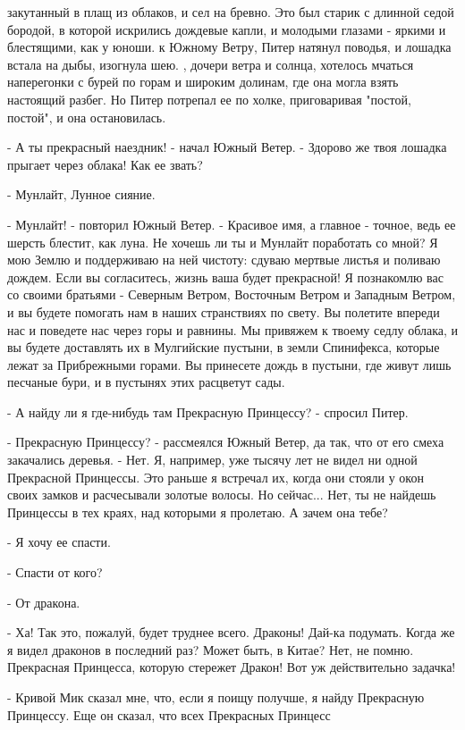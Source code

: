 закутанный в плащ из облаков, и сел на бревно. Это был старик с 
длинной седой бородой, в которой искрились дождевые капли, и молодыми 
глазами - яркими и блестящими, как у юноши.
 к Южному Ветру, Питер натянул поводья, и лошадка встала 
на дыбы, изогнула шею.
, дочери ветра и солнца, хотелось мчаться наперегонки с бурей по 
горам и широким долинам, где она могла взять настоящий разбег. Но 
Питер потрепал ее по холке, приговаривая "постой, постой", и она 
остановилась.
\par- А ты прекрасный наездник! - начал Южный Ветер. - Здорово же твоя 
лошадка прыгает через облака! Как ее звать?
\par- Мунлайт, Лунное сияние.
\par- Мунлайт! - повторил Южный Ветер. - Красивое имя, а главное - 
точное, ведь ее шерсть блестит, как луна. Не хочешь ли ты и Мунлайт 
поработать со мной? Я мою Землю и поддерживаю на ней чистоту: сдуваю 
мертвые листья и поливаю дождем. Если вы согласитесь, жизнь ваша будет 
прекрасной! Я познакомлю вас со своими братьями - Северным Ветром, 
Восточным Ветром и Западным Ветром, и вы будете помогать нам в наших 
странствиях по свету. Вы полетите впереди нас и поведете нас через 
горы и равнины. Мы привяжем к твоему седлу облака, и вы будете 
доставлять их в Мулгийские пустыни, в земли Спинифекса, которые лежат 
за Прибрежными горами. Вы принесете дождь в пустыни, где живут лишь 
песчаные бури, и в пустынях этих расцветут сады.
\par- А найду ли я где-нибудь там Прекрасную Принцессу? - спросил 
Питер.
\par- Прекрасную Принцессу? - рассмеялся Южный Ветер, да так, что от 
его смеха закачались деревья. - Нет. Я, например, уже тысячу лет не 
видел ни одной Прекрасной Принцессы. Это раньше я встречал их, когда 
они стояли у окон своих замков и расчесывали золотые волосы. Но 
сейчас... Нет, ты не найдешь Принцессы в тех краях, над которыми я 
пролетаю. А зачем она тебе?
\par- Я хочу ее спасти.
\par- Спасти от кого?
\par- От дракона.
\par- Ха! Так это, пожалуй, будет труднее всего. Драконы! Дай-ка 
подумать. Когда же я видел драконов в последний раз? Может быть, в 
Китае? Нет, не помню. Прекрасная Принцесса, которую стережет Дракон! 
Вот уж действительно задачка!
\par- Кривой Мик сказал мне, что, если я поищу получше, я найду 
Прекрасную Принцессу. Еще он сказал, что всех Прекрасных Принцесс 

